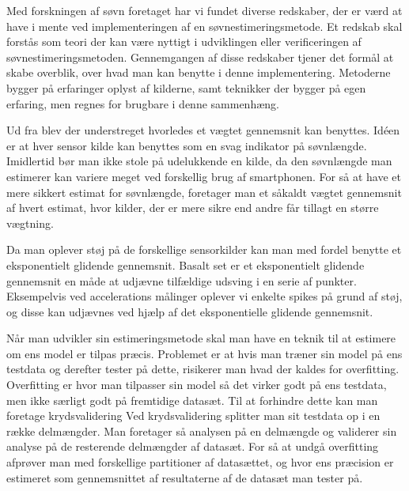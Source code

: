 Med forskningen af søvn foretaget har vi fundet diverse redskaber, der er værd at have i mente ved implementeringen af en søvnestimeringsmetode.
Et redskab skal forstås som teori der kan være nyttigt i udviklingen eller verificeringen af søvnestimeringsmetoden.
Gennemgangen af disse redskaber tjener det formål at skabe overblik, over hvad man kan benytte i denne implementering.
Metoderne bygger på erfaringer oplyst af kilderne, samt teknikker der bygger på egen erfaring, men regnes for brugbare i denne sammenhæng.

\begin{description}[style=nextline]
\item[Vægtet gennemsnit]
Ud fra \citet{6563918} blev der understreget hvorledes et vægtet gennemsnit kan benyttes.
Idéen er at hver sensor kilde kan benyttes som en svag indikator på søvnlængde.
Imidlertid bør man ikke stole på udelukkende en kilde, da den søvnlængde man estimerer kan variere meget ved forskellig brug af smartphonen.
For så at have et mere sikkert estimat for søvnlængde, foretager man et såkaldt vægtet gennemsnit af hvert estimat, hvor kilder, der er mere sikre end andre får tillagt en større vægtning.

\item[Eksponentielt glidende gennemsnit]
Da man oplever støj på de forskellige sensorkilder kan man med fordel benytte et eksponentielt glidende gennemsnit.
Basalt set er et eksponentielt glidende gennemsnit en måde at udjævne tilfældige udsving i en serie af punkter.
Eksempelvis ved accelerations målinger oplever vi enkelte spikes på grund af støj, og disse kan udjævnes ved hjælp af det eksponentielle glidende gennemsnit.

\item[Krydsvalidering]
Når man udvikler sin estimeringsmetode skal man have en teknik til at estimere om ens model er tilpas præcis.
Problemet er at hvis man træner sin model på ens testdata og derefter tester på dette, risikerer man hvad der kaldes for overfitting.
Overfitting er hvor man tilpasser sin model så det virker godt på ens testdata, men ikke særligt godt på fremtidige datasæt.
Til at forhindre dette kan man foretage krydsvalidering
Ved krydsvalidering splitter man sit testdata op i en række delmængder.
Man foretager så analysen på en delmængde og validerer sin analyse på de resterende delmængder af datasæt.
For så at undgå overfitting afprøver man med forskellige partitioner af datasættet, og hvor ens præcision er estimeret som gennemsnittet af resultaterne af de datasæt man tester på.

\end{description}